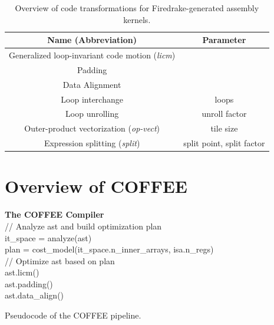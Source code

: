 \documentclass[conference]{IEEEtran}
\begin{document}
\begin{table}[h]
\begin{center}
\begin{tabulary}{1.0\columnwidth}{|C|C|}
\hline
Name (Abbreviation) & Parameter \\\hline\hline
Generalized loop-invariant code motion (\emph{licm}) &   \\ \hline
Padding &  \\ \hline
Data Alignment & \\ \hline
Loop interchange      & loops  \\ \hline
Loop unrolling  & unroll factor \\ \hline
Outer-product vectorization (\emph{op-vect}) & tile size \\ \hline
Expression splitting (\emph{split}) & split point, split factor \\ \hline
\end{tabulary}
\end{center}
\caption{Overview of code transformations for Firedrake-generated assembly kernels.}
\label{table:code-transformations}
\end{table}


\section{Overview of COFFEE}
\label{sec:pyop2-compiler}

\begin{algorithm}[t]
  \textbf{The COFFEE Compiler}\\
// Analyze ast and build optimization plan \\
it\_space = analyze(ast) \\
plan = cost\_model(it\_space.n\_inner\_arrays, isa.n\_regs) \\
// Optimize ast based on plan \\
ast.licm() \\
ast.padding() \\
ast.data\_align() \\
\caption{Pseudocode of the COFFEE pipeline.}
\label{algo:PyOP2Compiler}
\end{algorithm}
\end{document}
